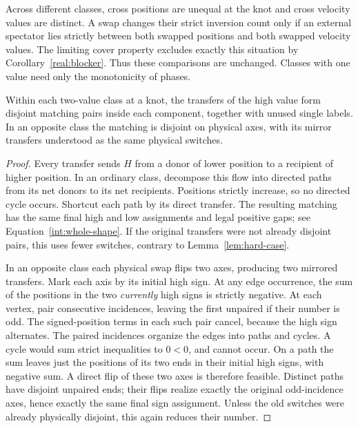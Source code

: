 Across different classes, cross positions are unequal at the knot
and cross velocity values are distinct.  A swap changes their strict
inversion count only if an external spectator lies strictly between
both swapped positions and both swapped velocity values.  The
limiting cover property excludes exactly this situation by
Corollary~\ref{real:blocker}.  Thus these
comparisons are unchanged.  Classes with one value need only the
monotonicity of phases.

\begin{lemma}\label{knot:matching}
Within each two-value class at a knot, the transfers of the high value
form disjoint matching pairs inside each component, together with
unused single labels.  In an opposite class the matching is disjoint
on physical axes, with its mirror transfers understood as the same
physical switches.
\end{lemma}

\begin{proof}
Every transfer sends \(H\) from a donor of lower position to a
recipient of higher position.  In an ordinary class, decompose this
flow into directed paths from its net donors to its net recipients.
Positions strictly increase, so no directed cycle occurs.  Shortcut
each path by its direct transfer.  The resulting matching has the
same final high and low assignments and legal positive gaps; see
Equation~\eqref{int:whole-shape}.  If the
original transfers were not already disjoint pairs, this uses fewer
switches, contrary to Lemma~\ref{lem:hard-case}.

In an opposite class each physical swap flips two axes, producing two
mirrored transfers.  Mark each axis by its initial high sign.  At any
edge occurrence, the sum of the positions in the two \emph{currently}
high signs is strictly negative.  At each vertex, pair consecutive
incidences, leaving the first unpaired if their number is odd.  The
signed-position terms in each such pair cancel, because the high sign
alternates.  The paired incidences organize the edges into paths and
cycles.  A cycle would sum strict inequalities to \(0<0\), and cannot
occur.  On a path the sum leaves just the positions of its two ends
in their initial high signs, with negative sum.  A direct flip of
these two axes is therefore feasible.  Distinct paths have disjoint
unpaired ends; their flips realize exactly the original odd-incidence
axes, hence exactly the same final sign assignment.  Unless the old
switches were already physically disjoint, this again reduces their
number.
\end{proof}

